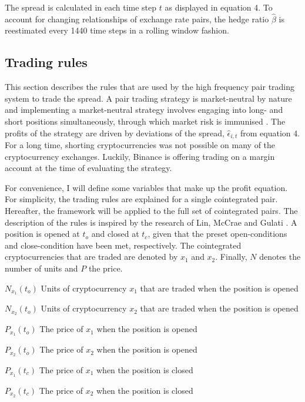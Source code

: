 \documentclass[12pt,english,authoryear]{article}
\begin{document}
The spread is calculated in each time step $t$ as displayed in equation 4. To account for changing relationships of exchange rate pairs, the hedge ratio $\hat{\beta}$ is reestimated every 1440 time steps in a rolling window fashion. 

\subsection{Trading rules} \label{sec:Trading rules}

This section describes the rules that are used by the high frequency pair trading system to trade the spread. A pair trading strategy is market-neutral by nature and implementing a market-neutral strategy involves engaging into long- and short positions simultaneously, through which market risk is immunised \cite{Jacobs_1993}. The profits of the strategy are driven by deviations of the spread, $\hat{\epsilon}_{i,t}$ from equation 4. For a long time, shorting cryptocurrencies was not possible on many of the cryptocurrency exchanges. Luckily, Binance is offering trading on a margin account at the time of evaluating the strategy. 

For convenience, I will define some variables that make up the profit equation. For simplicity, the trading rules are explained for a single cointegrated pair. Hereafter, the framework will be applied to the full set of cointegrated pairs. The description of the rules is inspired by the research of Lin, McCrae and Gulati \citeyear{Lin_2006}. A position is opened at $t_o$ and closed at $t_c$, given that the preset open-conditions and close-condition have been met, respectively. The cointegrated cryptocurrencies that are traded are denoted by $x_1$ and $x_2$. Finally, $N$ denotes the number of units and $P$ the price.
\bigskip

$N_{x_1}(t_o)$ \hspace{10mm} Units of cryptocurrency $x_1$ that are traded when the position is opened \par
$N_{x_2}(t_o)$ \hspace{10mm} Units of cryptocurrency $x_2$ that are traded when the position is opened\par
$P_{x_1}(t_o)$ \hspace{10mm} The price of $x_1$ when the position is opened\par
$P_{x_2}(t_o)$ \hspace{10mm} The price of $x_2$ when the position is opened\par
$P_{x_1}(t_c)$ \hspace{10mm} The price of $x_1$ when the position is closed\par
$P_{x_2}(t_c)$ \hspace{10mm} The price of $x_2$ when the position is closed\par
\end{document}
